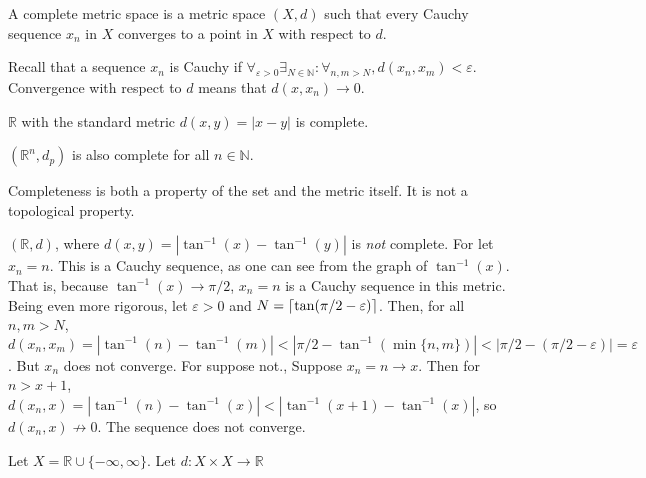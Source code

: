            \begin{definition}
                A complete metric space is a metric
                space $(X,d)$ such that every
                Cauchy sequence $x_{n}$
                in $X$ converges to a point in $X$
                with respect to $d$.
            \end{definition}
            Recall that a sequence $x_{n}$ is Cauchy if
            $\forall_{\varepsilon>0}\exists_{N\in\mathbb{N}}:%
             \forall_{n,m>N},d(x_{n},x_{m})<\varepsilon$.
            Convergence with respect to $d$ means that
            $d(x,x_{n})\rightarrow{0}$.
            \begin{example}
                $\mathbb{R}$ with the standard metric
                $d(x,y)=|x-y|$ is complete.
            \end{example}
            \begin{example}
                $(\mathbb{R}^{n},d_{p})$ is also complete
                for all $n\in\mathbb{N}$.
            \end{example}
            Completeness is both a property of the set
            and the metric itself. It is not a topological
            property.
            \begin{example}
                $(\mathbb{R},d)$, where
                $d(x,y)=|\tan^{-1}(x)-\tan^{-1}(y)|$
                is \textit{not} complete. For let
                $x_{n}=n$. This is a Cauchy sequence,
                as one can see from the graph
                of $\tan^{-1}(x)$. That is, because
                $\tan^{-1}(x)\rightarrow{\pi/2}$,
                $x_{n}=n$ is a Cauchy sequence in this
                metric. Being even more rigorous, let
                $\varepsilon>0$ and
                $N=\lceil\tan(\pi/2-\varepsilon)\rceil$.
                Then, for all $n,m>N$,
                $d(x_{n},x_{m})%
                 =|\tan^{-1}(n)-\tan^{-1}(m)|%
                 <|\pi/2-\tan^{-1}(\min\{n,m\})|%
                 <|\pi/2-(\pi/2-\varepsilon)|%
                 =\varepsilon$. But $x_{n}$ does not
                converge. For suppose not.,
                Suppose $x_{n}=n\rightarrow{x}$.
                Then for $n>x+1$,
                $d(x_{n},x)=|\tan^{-1}(n)-\tan^{-1}(x)|%
                 <|\tan^{-1}(x+1)-\tan^{-1}(x)|$,
                so $d(x_{n},x)\not\rightarrow{0}$.
                The sequence does not converge.
            \end{example}
            Let $X=\mathbb{R}\cup\{-\infty,\infty\}$.
            Let $d:X\times{X}\rightarrow\mathbb{R}$
